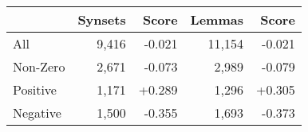 
        \begin{tabular}{lrrrr}
        & Synsets & Score & Lemmas & Score \\ \hline
        All      & 9,416   
        & -0.021  
        & 11,154   
        & -0.021  
        \\
        Non-Zero & 2,671
        & -0.073 
        & 2,989   
        & -0.079  
        \\
        Positive & 1,171

        & +0.289 
        & 1,296 
        & +0.305  
        \\
        Negative & 1,500
        & -0.355 
        & 1,693   
        & -0.373  
        \end{tabular}
        
